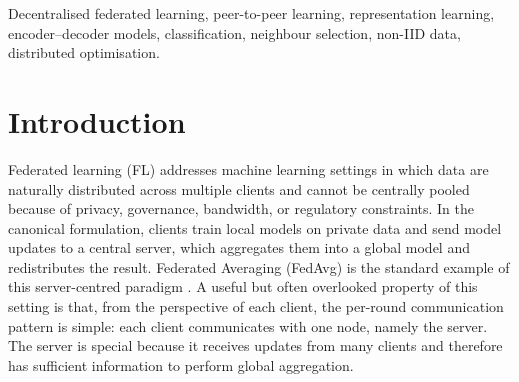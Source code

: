 \documentclass[conference]{IEEEtran}
\begin{document}
\begin{abstract}
We analyse the effect of the one-peer constraint theoretically, showing that repeated graph interaction can still support consensus while sparse peer choice may increase update variance, deviate from full-neighbour aggregation, and induce selection-dependent generalisation bias under non-IID data. This framing also clarifies the appropriate empirical comparison: the primary baselines are budget-matched one-peer methods, such as random gossip, static peer choice, and single-signal peer-selection rules, while server-based and full-neighbour methods serve as unconstrained references. The primary empirical claims of PEARL concern three robustness properties under non-IID data: reduction of negative transfer events, improvement in worst-client fairness, and emergence of a stable but non-degenerate selection structure as measured by normalised per-client selection entropy. Experiments on non-IID image classification show that informed peer selection consistently reduces negative transfer and improves worst-client accuracy relative to random and static peer exchange under the same communication budget. Overall, PEARL establishes a principled formulation, algorithmic protocol, theoretical foundation, and empirical methodology for learning whom to learn from in decentralised representation learning.
\end{abstract}


\begin{IEEEkeywords}
Decentralised federated learning, peer-to-peer learning, representation learning, encoder--decoder models, classification, neighbour selection, non-IID data, distributed optimisation.
\end{IEEEkeywords}

\section{Introduction}
\label{sec:introduction}
Federated learning (FL) addresses machine learning settings in which data are naturally distributed across multiple clients and cannot be centrally pooled because of privacy, governance, bandwidth, or regulatory constraints. In the canonical formulation, clients train local models on private data and send model updates to a central server, which aggregates them into a global model and redistributes the result. Federated Averaging (FedAvg) is the standard example of this server-centred paradigm \cite{mcmahan2017communication}. A useful but often overlooked property of this setting is that, from the perspective of each client, the per-round communication pattern is simple: each client communicates with one node, namely the server. The server is special because it receives updates from many clients and therefore has sufficient information to perform global aggregation.
\end{document}

